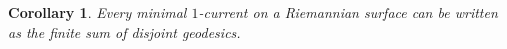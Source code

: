 \documentclass[reqno,12pt,letterpaper]{amsart}
\newcommand{\NN}{\mathbf{N}}
\newcommand{\RR}{\mathbf{R}}
\newcommand{\Hyp}{\mathbf H}
\newtheorem{corollary}[theorem]{Corollary}
\theoremstyle{definition}
\newtheorem{example}[theorem]{Example}
\numberwithin{equation}{section}
\begin{document}
\begin{corollary}\label{main crly 2}
Every minimal $1$-current on a Riemannian surface can be written as the finite sum of disjoint geodesics.
\end{corollary}
%
%
%
%
\end{document}

